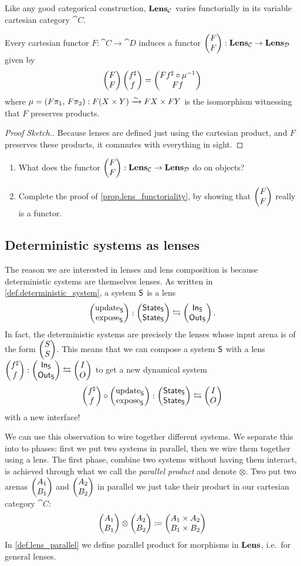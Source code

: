 \documentclass[DynamicalBook]{subfiles}
\begin{document}
Like any good categorical construction, $\textbf{Lens}_{\mathcal{C}}$ varies
functorially in its variable cartesian category $\cat{C}$.
\begin{proposition}\label{prop.lens_functoriality}
  Every cartesian functor $F : \cat{C} \to \cat{D}$ induces a functor
  $\begin{pmatrix}{F} \\ {F} \end{pmatrix} : \textbf{Lens}_{\mathcal{C}} \to \textbf{Lens}_{\mathcal{D}}$ given by
  $$\begin{pmatrix}{F} \\ {F} \end{pmatrix}\begin{pmatrix}{f^{\sharp}} \\ {f} \end{pmatrix} = \begin{pmatrix}{Ff^{\sharp} \circ \mu^{-1}} \\ {Ff} \end{pmatrix}$$
  where $\mu = (F\pi_1,\, F\pi_2) : F(X \times Y) \xrightarrow{\sim} FX \times FY$ is
  the isomorphism witnessing that $F$ preserves products.
\end{proposition}
\begin{proof}[Proof Sketch.]
  Because lenses are defined just using the cartesian product, and $F$ preserves
  these products, it commutes with everything in sight.
\end{proof}

\begin{exercise}
 \begin{enumerate}
 	\item What does the functor $\begin{pmatrix}{F} \\ {F} \end{pmatrix}: \textbf{Lens}_{\mathcal{C}} \to \textbf{Lens}_{\mathcal{D}}$ do on objects?
	\item Complete the proof of \cref{prop.lens_functoriality}, by showing that $\begin{pmatrix}{F} \\ {F} \end{pmatrix}$ really is a functor.
	\qedhere
\end{enumerate}
\end{exercise}

\subsection{Deterministic systems as lenses}

The reason we are interested in lenses and lens composition is because
deterministic systems are themselves lenses. As written in
\cref{def.deterministic_system}, a system $\mathsf{S}$ is a lens
$$\begin{pmatrix}{\mathrm{update}_{\mathsf{S}}} \\ {\mathrm{expose}_{\mathsf{S}}} \end{pmatrix} : \begin{pmatrix}{\mathsf{State}_{\mathsf{S}}} \\ {\mathsf{State}_{\mathsf{S}}} \end{pmatrix} \leftrightarrows \begin{pmatrix}{\mathsf{In}_{\mathsf{S}}} \\ {\mathsf{Out}_{\mathsf{S}}} \end{pmatrix}.$$
In fact, the deterministic systems are precisely the lenses whose input arena is of the form $\begin{pmatrix}{S} \\ {S} \end{pmatrix}$. This means that we can compose
a system $\mathsf{S}$ with a lens $\begin{pmatrix}{f^{\sharp}} \\ {f} \end{pmatrix} : \begin{pmatrix}{\mathsf{In}_{\mathsf{S}}} \\ {\mathsf{Out}_{\mathsf{S}}} \end{pmatrix}
\leftrightarrows \begin{pmatrix}{I} \\ {O} \end{pmatrix}$ to get a new dynamical system
$$\begin{pmatrix}{f^{\sharp}} \\ {f} \end{pmatrix} \circ \begin{pmatrix}{\mathrm{update}_{\mathsf{S}}} \\ {\mathrm{expose}_{\mathsf{S}}} \end{pmatrix} :
\begin{pmatrix}{\mathsf{State}_{\mathsf{S}}} \\ {\mathsf{State}_{\mathsf{S}}} \end{pmatrix} \leftrightarrows \begin{pmatrix}{I} \\ {O} \end{pmatrix}$$
with a new interface!

We can use this observation to wire together different systems. We separate this into to phases: first we put two systems in parallel, then we wire them together using a lens. The first phase, combine two systems without having them interact, is achieved through what we call the \emph{parallel product} and denote $\otimes$. Two put two arenas $\begin{pmatrix}{A_1} \\ {B_1} \end{pmatrix}$ and $\begin{pmatrix}{A_2} \\ {B_2} \end{pmatrix}$ in parallel we just take their product in our cartesian category $\cat{C}$:
\[
\begin{pmatrix}{A_1} \\ {B_1} \end{pmatrix}\otimes\begin{pmatrix}{A_2} \\ {B_2} \end{pmatrix}\coloneqq\begin{pmatrix}{A_1\times A_2} \\ {B_1\times B_2} \end{pmatrix}
\]
In \cref{def.lens_parallel} we define parallel product for morphisms in $\textbf{Lens}$, i.e.\ for general lenses.
\end{document}
